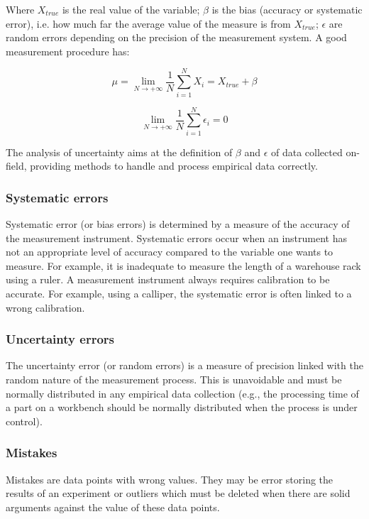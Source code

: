 Where $X_{true}$ is the real value of the variable; $\beta$ is the bias (accuracy or systematic error), i.e. how much far the average value of the measure is from $X_{true}$; $\epsilon$ are random errors depending on the precision of the measurement system. A good measurement procedure has:

\begin{equation}
\mu=\lim_{N \to +\infty}{\frac{1}{N}\sum_{i=1}^{N}{X_i=X_{true}+\beta}}
\label{eq_measurement2}
\end{equation}

\begin{equation}
\lim_{N \to +\infty}{\frac{1}{N}\sum_{i=1}^{N}{\epsilon_i=0}}
\label{eq_measurement3}
\end{equation}

The analysis of uncertainty aims at the definition of $\beta$ and $\epsilon$ of data collected on-field, providing methods to handle and process empirical data correctly.

\subsubsection{Systematic errors}
Systematic error (or bias errors) is determined by a measure of the accuracy of the measurement instrument. Systematic errors occur when an instrument has not an appropriate level of accuracy compared to the variable one wants to measure. For example, it is inadequate to measure the length of a warehouse rack using a ruler. A measurement instrument always requires calibration to be accurate. For example, using a calliper, the systematic error is often linked to a wrong calibration. 

\subsubsection{Uncertainty errors}
The uncertainty error (or random errors) is a measure of precision linked with the random nature of the measurement process. This is unavoidable and must be normally distributed in any empirical data collection (e.g., the processing time of a part on a workbench should be normally distributed when the process is under control).

\subsubsection{Mistakes}
Mistakes are data points with wrong values. They may be error storing the results of an experiment or outliers which must be deleted when there are solid arguments against the value of these data points.

